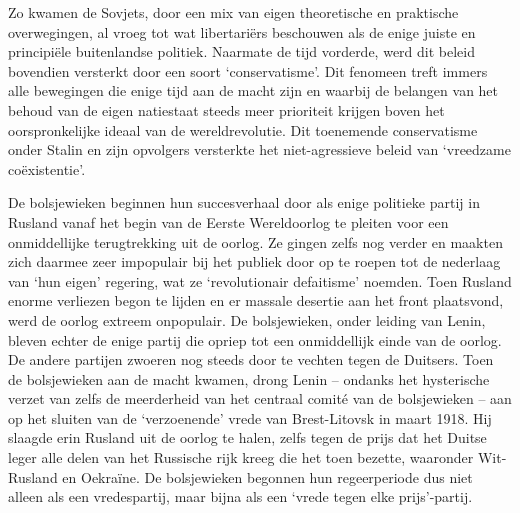 \documentclass[
  a5paper,
  smalldemyvopaper,10pt,twoside,onecolumn,openright,extrafontsizes,hidelinks]{memoir}
\begin{document}
Zo kwamen de Sovjets, door een mix van eigen theoretische en praktische
overwegingen, al vroeg tot wat libertariërs beschouwen als de enige
juiste en principiële buitenlandse politiek. Naarmate de tijd vorderde,
werd dit beleid bovendien versterkt door een soort `conservatisme'. Dit
fenomeen treft immers alle bewegingen die enige tijd aan de macht zijn
en waarbij de belangen van het behoud van de eigen natiestaat steeds
meer prioriteit krijgen boven het oorspronkelijke ideaal van de
wereldrevolutie. Dit toenemende conservatisme onder Stalin en zijn
opvolgers versterkte het niet-agressieve beleid van `vreedzame
coëxistentie'.

De bolsjewieken beginnen hun succesverhaal door als enige politieke
partij in Rusland vanaf het begin van de Eerste Wereldoorlog te pleiten
voor een onmiddellijke terugtrekking uit de oorlog. Ze gingen zelfs nog
verder en maakten zich daarmee zeer impopulair bij het publiek door op
te roepen tot de nederlaag van `hun eigen' regering, wat ze
`revolutionair defaitisme' noemden. Toen Rusland enorme verliezen begon
te lijden en er massale desertie aan het front plaatsvond, werd de
oorlog extreem onpopulair. De bolsjewieken, onder leiding van Lenin,
bleven echter de enige partij die opriep tot een onmiddellijk einde van
de oorlog. De andere partijen zwoeren nog steeds door te vechten tegen
de Duitsers. Toen de bolsjewieken aan de macht kwamen, drong Lenin --
ondanks het hysterische verzet van zelfs de meerderheid van het centraal
comité van de bolsjewieken -- aan op het sluiten van de `verzoenende'
vrede van Brest-Litovsk in maart 1918. Hij slaagde erin Rusland uit de
oorlog te halen, zelfs tegen de prijs dat het Duitse leger alle delen
van het Russische rijk kreeg die het toen bezette, waaronder Wit-Rusland
en Oekraïne. De bolsjewieken begonnen hun regeerperiode dus niet alleen
als een vredespartij, maar bijna als een `vrede tegen elke
prijs'-partij.
\end{document}
